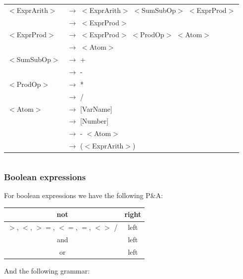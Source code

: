 \documentclass[letterpaper]{article}
\begin{document}
    \begin{center}
            \begin{tabular}{l l}
                $<$ExprArith$>$ &$\rightarrow$
                $<$ExprArith$>$ $<$SumSubOp$>$ $<$ExprProd$>$ \\
                 &$\rightarrow$ $<$ExprProd$>$ \\
                $<$ExprProd$>$ &$\rightarrow$
                $<$ExprProd$>$ $<$ProdOp$>$ $<$Atom$>$ \\
                 &$\rightarrow$ $<$Atom$>$ \\

                $<$SumSubOp$>$ &$\rightarrow$ + \\
                 &$\rightarrow$ - \\

                $<$ProdOp$>$ &$\rightarrow$ * \\
                 &$\rightarrow$ / \\

                $<$Atom$>$ &$\rightarrow$ [VarName] \\
                 &$\rightarrow$ [Number] \\
                 &$\rightarrow$ - $<$Atom$>$ \\
                 &$\rightarrow$ ($<$ExprArith$>$) \\

            \end{tabular}
    \end{center}


\begin{lstlisting}
\end{lstlisting}


\subsubsection{Boolean expressions}

For boolean expressions we have the following P\&A:


\begin{tabular}{|c|c|}
    \hline
    not & right \\
    \hline
    $>$, $<$, $>=$, $<=$, $=$, $<>$ / & left \\
    \hline
    and & left \\
    \hline
    or & left \\
    \hline
\end{tabular}

And the following grammar:
\end{document}
